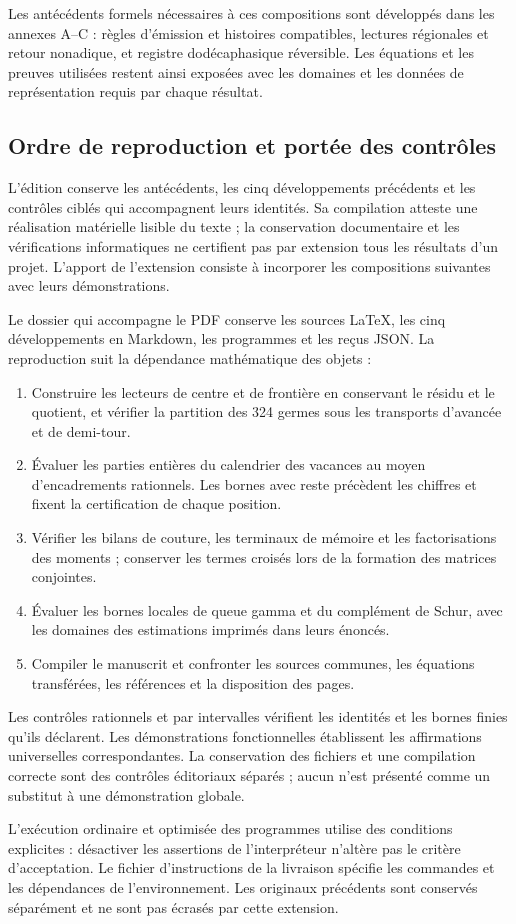 Les antécédents formels nécessaires à ces compositions sont
développés dans les annexes A--C : règles d'émission et histoires compatibles,
lectures régionales et retour nonadique, et registre dodécaphasique réversible.
Les équations et les preuves utilisées restent ainsi exposées avec
les domaines et les données de représentation requis par chaque résultat.

\clearpage
\subsection{Ordre de reproduction et portée des contrôles}

L'édition conserve les antécédents, les cinq développements précédents et les contrôles ciblés qui accompagnent leurs identités. Sa compilation atteste une réalisation matérielle lisible du texte ; la conservation documentaire et les vérifications informatiques ne certifient pas par extension tous les résultats d'un projet. L'apport de l'extension consiste à incorporer les compositions suivantes avec leurs démonstrations.

Le dossier qui accompagne le PDF conserve les sources \LaTeX{}, les cinq
développements en Markdown, les programmes et les reçus JSON. La reproduction
suit la dépendance mathématique des objets :

\begin{enumerate}
\item Construire les lecteurs de centre et de frontière en conservant le résidu et
le quotient, et vérifier la partition des 324 germes sous les transports
d'avancée et de demi-tour.
\item Évaluer les parties entières du calendrier des vacances au moyen
d'encadrements rationnels. Les bornes avec reste précèdent les chiffres et fixent
la certification de chaque position.
\item Vérifier les bilans de couture, les terminaux de mémoire et les
factorisations des moments ; conserver les termes croisés lors de la formation
des matrices conjointes.
\item Évaluer les bornes locales de queue gamma et du complément de Schur,
avec les domaines des estimations imprimés dans leurs énoncés.
\item Compiler le manuscrit et confronter les sources communes, les équations transférées, les références et la disposition des pages.
\end{enumerate}

Les contrôles rationnels et par intervalles vérifient les identités et
les bornes finies qu'ils déclarent. Les démonstrations fonctionnelles établissent
les affirmations universelles correspondantes. La conservation des
fichiers et une compilation correcte sont des contrôles éditoriaux séparés ;
aucun n'est présenté comme un substitut à une démonstration globale.

L'exécution ordinaire et optimisée des programmes utilise des conditions explicites : désactiver les assertions de l'interpréteur n'altère pas le critère d'acceptation. Le fichier d'instructions de la livraison spécifie les commandes et les dépendances de l'environnement. Les originaux précédents sont conservés séparément et ne sont pas écrasés par cette extension.
\par\endgroup
